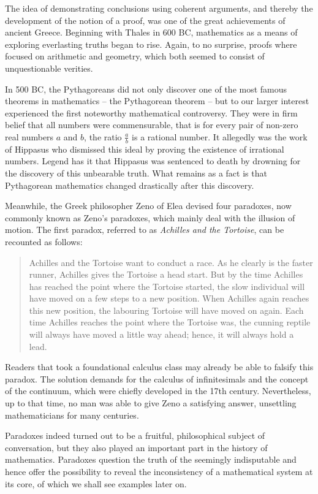 \documentclass{article}
\def\righttriangle{
\scalebox{0.7}{
\begin{picture}(5,0)
\hspace{-0.2em}
\put(0,0){\line(1,0){10}}
\put(10,0){\line(-1,1){10}}
\put(0,0){\line(0,1){10}}
\end{picture}
}
}
\begin{document}
The idea of demonstrating conclusions using coherent arguments, and thereby the development of the notion of a proof, was one of the great achievements of ancient Greece.
Beginning with Thales in 600 BC, mathematics as a means of exploring everlasting truths began to rise. Again, to no surprise, proofs where focused on arithmetic and geometry, which both seemed to consist of unquestionable verities.

In 500 BC, the Pythagoreans did not only discover one of the most famous theorems in mathematics -- the Pythagorean theorem\righttriangle -- but to our larger interest experienced the first noteworthy mathematical controversy. They were in firm belief that all numbers were commensurable, that is for every pair of non-zero real numbers $a$ and $b$, the ratio $\frac{a}{b}$ is a rational number. It allegedly was the work of Hippasus who dismissed this ideal by proving the existence of irrational numbers. Legend has it that Hippasus was sentenced to death by drowning for the discovery of this unbearable truth. What remains as a fact is that Pythagorean mathematics changed drastically after this discovery.

Meanwhile, the Greek philosopher Zeno of Elea devised four paradoxes, now commonly known as Zeno's paradoxes, which mainly deal with the illusion of motion. The first paradox, referred to as \textit{Achilles and the Tortoise}, can be recounted as follows:
\begin{quote}\label{zeno_paradox}
Achilles and the Tortoise want to conduct a race. As he clearly is the faster runner, Achilles gives the Tortoise a head start. But by the time Achilles has reached the point where the Tortoise started, the slow individual will have moved on a few steps to a new position. When Achilles again reaches this new position, the labouring Tortoise will have moved on again. Each time Achilles reaches the point where the Tortoise was, the cunning reptile will always have moved a little way ahead; hence, it will always hold a lead.\cite[Aristotle, {\textit{Physics} VI:9, 239b15}]{physics}
\end{quote}
Readers that took a foundational calculus class may already be able to falsify this paradox. The solution demands for the calculus of infinitesimals and the concept of the continuum, which were chiefly developed in the 17th century. Nevertheless, up to that time, no man was able to give Zeno a satisfying answer, unsettling mathematicians for many centuries.

Paradoxes indeed turned out to be a fruitful, philosophical subject of conversation, but they also played an important part in the history of mathematics. Paradoxes question the truth of the seemingly indisputable and hence offer the possibility to reveal the inconsistency of a mathematical system at its core, of which we shall see examples later on.
\end{document}
